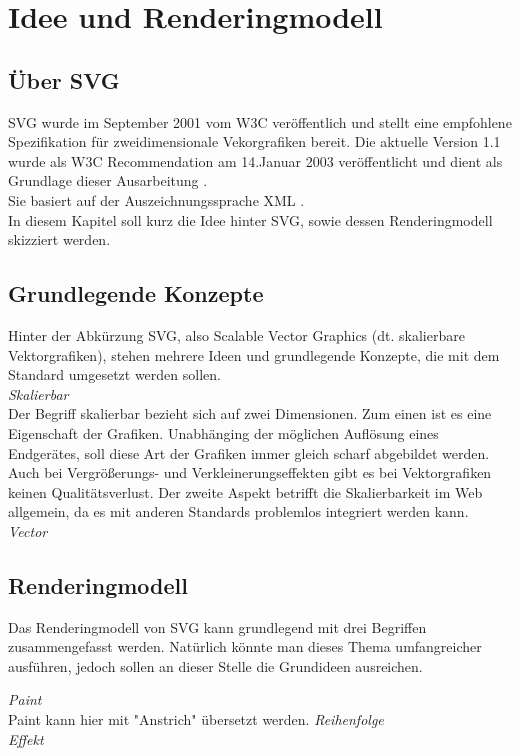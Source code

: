 \section{Idee und Renderingmodell}
\subsection{Über SVG}
SVG wurde im September 2001 vom W3C veröffentlich und stellt eine empfohlene Spezifikation für zweidimensionale Vekorgrafiken bereit. Die aktuelle Version 1.1 wurde als W3C Recommendation am 14.Januar 2003 veröffentlicht und dient als Grundlage dieser Ausarbeitung \cite{svg:2003}.\\
Sie basiert auf der Auszeichnungssprache XML \cite{xml:2008}.\\
In diesem Kapitel soll kurz die Idee hinter SVG, sowie dessen Renderingmodell skizziert werden.

\subsection{Grundlegende Konzepte}
Hinter der Abkürzung SVG, also Scalable Vector Graphics (dt. skalierbare Vektorgrafiken), stehen mehrere Ideen und grundlegende Konzepte, die mit dem Standard umgesetzt werden sollen.\\

\textit{Skalierbar}\\
Der Begriff skalierbar bezieht sich auf zwei Dimensionen. Zum einen ist es eine Eigenschaft der Grafiken. Unabhänging der möglichen Auflösung eines Endgerätes, soll diese Art der Grafiken immer gleich scharf abgebildet werden. Auch bei Vergrößerungs- und Verkleinerungseffekten gibt es bei Vektorgrafiken keinen Qualitätsverlust.
Der zweite Aspekt betrifft die Skalierbarkeit im Web allgemein, da es mit anderen Standards problemlos integriert werden kann.\\

\emph{Vector}\\

 
\subsection{Renderingmodell}
Das Renderingmodell von SVG kann grundlegend mit drei Begriffen zusammengefasst werden. Natürlich könnte man dieses Thema umfangreicher ausführen, jedoch sollen an dieser Stelle die Grundideen ausreichen.

\emph{Paint}\\
Paint kann hier mit "Anstrich" übersetzt werden.
\emph{Reihenfolge}\\
\emph{Effekt}\\